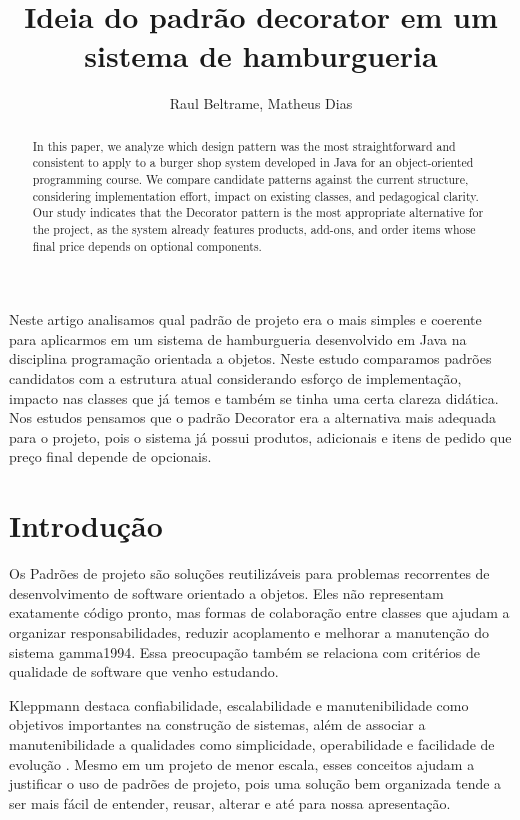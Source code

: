 \documentclass[12pt]{article}
\title{Ideia do padrão decorator em um sistema de hamburgueria}
\author{Raul Beltrame\inst{1}, Matheus Dias\inst{1}}
\begin{document}
\maketitle

\begin{resumo}
Neste artigo analisamos qual padrão de projeto era o mais simples e coerente para aplicarmos em um sistema de hamburgueria desenvolvido em Java na disciplina programação orientada a objetos. Neste estudo comparamos padrões candidatos com a estrutura atual considerando esforço de implementação, impacto nas classes que já temos e também se tinha uma certa clareza didática. Nos estudos pensamos que o padrão Decorator era a alternativa mais adequada para o projeto, pois o sistema já possui produtos, adicionais e itens de pedido que preço final depende de opcionais.
\end{resumo}

\begin{abstract}
In this paper, we analyze which design pattern was the most straightforward and consistent to apply to a burger shop system developed in Java for an object-oriented programming course. We compare candidate patterns against the current structure, considering implementation effort, impact on existing classes, and pedagogical clarity. Our study indicates that the Decorator pattern is the most appropriate alternative for the project, as the system already features products, add-ons, and order items whose final price depends on optional components.
\end{abstract}

\section{Introdução}

Os Padrões de projeto são soluções reutilizáveis para problemas recorrentes de desenvolvimento de software orientado a objetos. Eles não representam exatamente código pronto, mas formas de colaboração entre classes que ajudam a organizar responsabilidades, reduzir acoplamento e melhorar a manutenção do sistema {gamma1994}. Essa preocupação também se relaciona com critérios de qualidade de software que venho estudando. 

Kleppmann destaca confiabilidade, escalabilidade e manutenibilidade como objetivos importantes na construção de sistemas, além de associar a manutenibilidade a qualidades como simplicidade, operabilidade e facilidade de evolução . Mesmo em um projeto de menor escala, esses conceitos ajudam a justificar o uso de padrões de projeto, pois uma solução bem organizada tende a ser mais fácil de entender, reusar, alterar e até para nossa apresentação.
\end{document}
